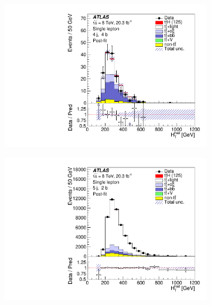 \begin{figure}[tpb!]
\begin{subfigure}{0.44\textwidth}
  \caption{}\end{subfigure}
  \begin{subfigure}{0.44\textwidth}
  \includegraphics[width=\textwidth]{Analysis/Figures_ttH/HTHad_4jetex4btagin8TeV.pdf}
  \caption{}\end{subfigure}
  \begin{subfigure}{0.44\textwidth}
  \includegraphics[width=\textwidth]{Analysis/Figures_ttH/HTHad_5jetex2btagex8TeV.pdf}
  \caption{}\end{subfigure}
  \begin{subfigure}{0.44\textwidth}

\end{subfigure}
\end{figure}
